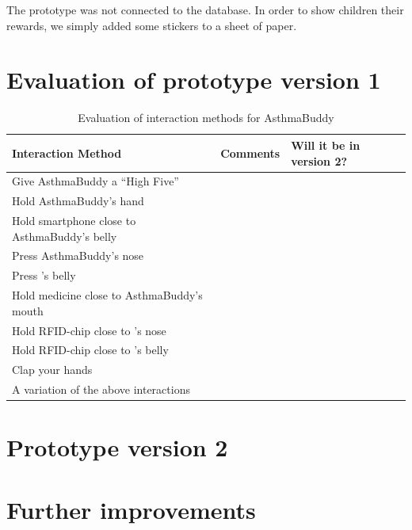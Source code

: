 The prototype was not connected to the database. In order to show children their rewards, we simply added some stickers to a sheet of paper. 


\section{Evaluation of prototype version 1}

\begin{table}
\begin{tabular}{|p{5.0cm} | p{6.0cm} | p{3.0cm} |}
\hline 
\textbf{Interaction Method} & \textbf{Comments} & \textbf{Will it be in version 2?}\\
\hline
	Give AsthmaBuddy a ``High Five'' & & \\
\hline
	Hold AsthmaBuddy's hand & & \\
\hline
	Hold smartphone close to AsthmaBuddy's belly & & \\
\hline
	Press AsthmaBuddy's nose & & \\
\hline
	Press \buddy{}'s belly & & \\
\hline
	Hold medicine close to AsthmaBuddy's mouth & & \\
\hline
	Hold RFID-chip close to \buddy{}'s nose & & \\
\hline
	Hold RFID-chip close to \buddy{}'s belly & & \\
\hline
	Clap your hands & & \\
\hline
	A variation of the above interactions & & \\
\hline
\end{tabular}
\caption{Evaluation of interaction methods for AsthmaBuddy}
\label{tab:interactioneval}
\end{table}


\section{Prototype version 2}


\section{Further improvements}

